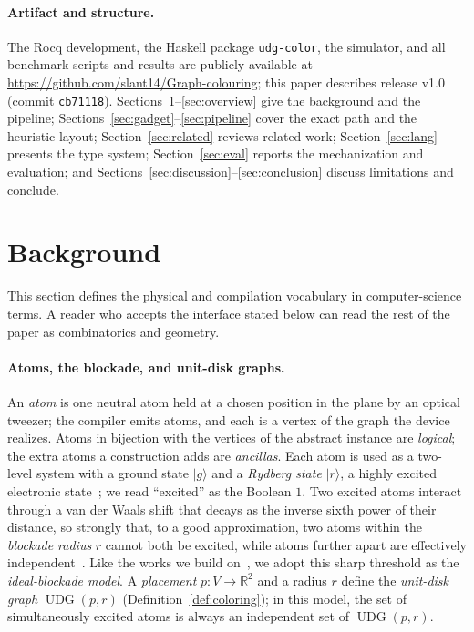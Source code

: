 \documentclass[a4paper,fleqn]{cas-sc}
\newcommand{\UDG}{\operatorname{UDG}}
\newcommand{\R}{\mathbb{R}}
\begin{document}
\paragraph{Artifact and structure.} The Rocq development, the Haskell package
\texttt{udg-color}, the simulator, and all benchmark scripts and results are publicly
available at \url{https://github.com/slant14/Graph-colouring}; this paper describes
release v1.0 (commit \texttt{cb71118}).
Sections~\ref{sec:background}--\ref{sec:overview} give the background and the
pipeline; Sections~\ref{sec:gadget}--\ref{sec:pipeline} cover the exact path and the
heuristic layout; Section~\ref{sec:related} reviews related work;
Section~\ref{sec:lang} presents the type system; Section~\ref{sec:eval} reports the
mechanization and evaluation; and
Sections~\ref{sec:discussion}--\ref{sec:conclusion} discuss limitations and conclude.

\section{Background}
\label{sec:background}

This section defines the physical and compilation vocabulary in computer-science
terms. A reader who accepts the interface stated below can read the rest of the paper as combinatorics and geometry.

\paragraph{Atoms, the blockade, and unit-disk graphs.} An \emph{atom} is one neutral
atom held at a chosen position in the plane by an optical tweezer; the compiler emits
atoms, and each is a vertex of the graph the device realizes. Atoms in bijection with
the vertices of the abstract instance are \emph{logical}; the extra atoms a
construction adds are \emph{ancillas}. Each atom is used as a two-level system with a
ground state $\lvert g\rangle$ and a \emph{Rydberg state} $\lvert r\rangle$, a highly
excited electronic state~\cite{Saffman2010}; we read ``excited'' as the Boolean $1$.
Two excited atoms interact through a van der Waals shift that decays as the inverse
sixth power of their distance, so strongly that, to a good approximation, two atoms
within the \emph{blockade radius} $r$ cannot both be excited, while atoms further
apart are effectively independent~\cite{Saffman2010,Henriet2020,Scholl2021}. Like the
works we build on~\cite{Pichler2018,Nguyen2023}, we adopt this sharp threshold as the
\emph{ideal-blockade model}. A \emph{placement} $p:V\to\R^2$ and a radius $r$ define
the \emph{unit-disk graph} $\UDG(p,r)$ (Definition~\ref{def:coloring}); in this model,
the set of simultaneously excited atoms is always an independent set of $\UDG(p,r)$.
\end{document}
